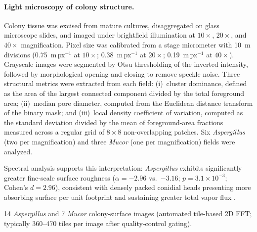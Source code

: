 \paragraph{Light microscopy of colony structure.}
Colony tissue was excised from mature cultures, disaggregated on glass
microscope slides, and imaged under brightfield illumination at
$10\times$, $20\times$, and $40\times$ magnification.  Pixel size was
calibrated from a stage micrometer with 10~\textmu m divisions
(0.75~\textmu m\,px$^{-1}$ at $10\times$;
0.38~\textmu m\,px$^{-1}$ at $20\times$;
0.19~\textmu m\,px$^{-1}$ at $40\times$).  Grayscale images were
segmented by Otsu thresholding of the inverted intensity, followed by
morphological opening and closing to remove speckle noise.  Three
structural metrics were extracted from each field: (i)~cluster
dominance, defined as the area of the largest connected component
divided by the total foreground area; (ii)~median pore diameter,
computed from the Euclidean distance transform of the binary mask; and
(iii)~local density coefficient of variation, computed as the standard
deviation divided by the mean of foreground-area fractions measured
across a regular grid of $8 \times 8$ non-overlapping patches.  Six
\textit{Aspergillus} (two per magnification) and three \textit{Mucor}
(one per magnification) fields were analyzed.



Spectral analysis supports this interpretation:
\textit{Aspergillus} exhibits significantly greater fine-scale surface
roughness ($\alpha = -2.96$ vs.\ $-3.16$; $p = 3.1 \times 10^{-3}$;
Cohen's $d = 2.96$), consistent with densely packed conidial heads
presenting more absorbing surface per unit footprint and sustaining
greater total vapor flux \cite{sun2017}.



14 \textit{Aspergillus} and 7 \textit{Mucor} colony-surface images
(automated tile-based 2D FFT; typically 360--470 tiles per image after
quality-control gating).


